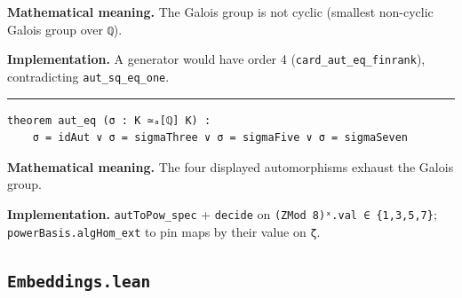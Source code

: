 \documentclass[UTF8,a4paper,11pt,fontset=fandol]{ctexart}
\theoremstyle{definition}
\newcommand{\statementsep}{\par\medskip\hrule\medskip}
\begin{document}
\noindent\textbf{Mathematical meaning.} The Galois group is not cyclic (smallest non-cyclic Galois group over \texttt{ℚ}).\par
\noindent\textbf{Implementation.} A generator would have order 4 (\texttt{card\_\allowbreak{}aut\_\allowbreak{}eq\_\allowbreak{}finrank}), contradicting \texttt{aut\_\allowbreak{}sq\_\allowbreak{}eq\_\allowbreak{}one}.\par
\statementsep
\begin{verbatim}
theorem aut_eq (σ : K ≃ₐ[ℚ] K) :
    σ = idAut ∨ σ = sigmaThree ∨ σ = sigmaFive ∨ σ = sigmaSeven
\end{verbatim}
\noindent\textbf{Mathematical meaning.} The four displayed automorphisms exhaust the Galois group.\par
\noindent\textbf{Implementation.} \texttt{autToPow\_\allowbreak{}spec} + \texttt{decide} on \texttt{(ZMod 8)ˣ.\allowbreak{}val ∈ \{1,3,5,7\}}; \texttt{powerBasis.\allowbreak{}algHom\_\allowbreak{}ext} to pin maps by their value on \texttt{ζ}.\par

\subsection{\texttt{Embeddings.lean}}
\end{document}

